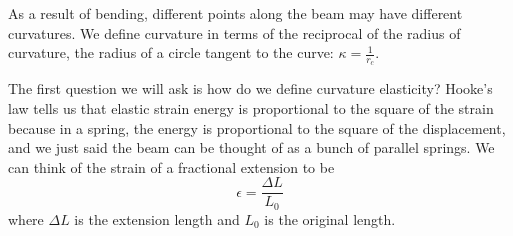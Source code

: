 \documentclass[a4paper,twoside,master.tex]{subfiles}
\begin{document}
As a result of bending, different points along the beam may have different curvatures. We define curvature in terms of the reciprocal of the radius of curvature, the radius of a circle tangent to the curve: $ \kappa = \frac{1}{r_c} $.

The first question we will ask is how do we define curvature elasticity? Hooke's law tells us that elastic strain energy is proportional to the square of the strain because in a spring, the energy is proportional to the square of the displacement, and we just said the beam can be thought of as a bunch of parallel springs. We can think of the strain of a fractional extension to be
\begin{equation}
    \epsilon = \frac{\Delta L}{L_0} 
\end{equation}
where $ \Delta L $ is the extension length and $ L_0 $ is the original length.
\end{document}

